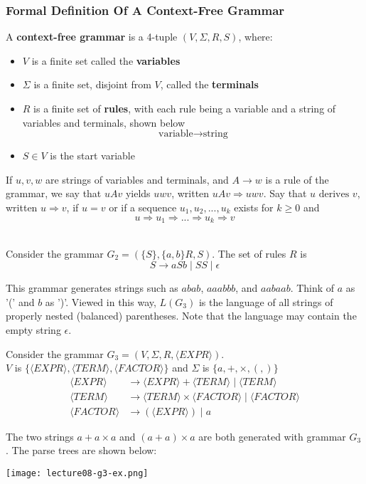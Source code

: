 \documentclass[11pt,a4paper]{article}
\begin{document}
\newpage
\subsubsection{Formal Definition Of A Context-Free Grammar}
\begin{definition}
    A \textbf{context-free grammar} is a 4-tuple $(V,\Sigma,R,S)$, where:
    \begin{itemize}
        \item $V$ is a finite set called the \textbf{variables}
        \item $\Sigma$ is a finite set, disjoint from $V$, called the \textbf{terminals}
        \item $R$ is a finite set of \textbf{rules}, with each rule being a variable and a string of variables and terminals, shown below
        $$\text{variable}\rightarrow\text{string}$$
        \item $S\in V$ is the start variable
    \end{itemize}
\end{definition}

If $u,v,w$ are strings of variables and terminals, and $A\rightarrow w$ is a rule of the grammar, we say that $uAv$ yields $uwv$, written $uAv\Rightarrow uwv$.
Say that $u\text{ derives } v$, written $u\Rightarrow v$, if $u=v$ or if a sequence $u_1,u_2,...,u_k$ exists for $k\geq 0$ and $$u\Rightarrow u_1\Rightarrow ...\Rightarrow u_k\Rightarrow v$$ \\


\begin{example}
    Consider the grammar $G_2=(\{S\},\{a,b\}R,S)$. The set of rules $R$ is $$S\rightarrow aSb\mid SS\mid\epsilon$$

    This grammar generates strings such as $abab$, $aaabbb$, and $aabaab$.
    Think of $a$ as '(' and $b$ as ')'. Viewed in this way, $L(G_3)$ is the language of all strings of properly nested (balanced) parentheses.
    Note that the language may contain the empty string $\epsilon$.
\end{example}

\begin{example}
    Consider the grammar $G_3=(V,\Sigma,R,\langle EXPR\rangle)$. \\

    $V$ is $\{\langle EXPR\rangle,\langle TERM\rangle,\langle FACTOR\rangle\}$ and $\Sigma$ is $\{a,+,\times, (, )\}$
    \begin{align*}
        \langle EXPR\rangle &\rightarrow\langle EXPR\rangle+\langle TERM\rangle\mid\langle TERM\rangle \\
        \langle TERM\rangle &\rightarrow\langle TERM\rangle\times\langle FACTOR\rangle\mid\langle FACTOR\rangle \\
        \langle FACTOR\rangle &\rightarrow (\langle EXPR\rangle)\mid a
    \end{align*}

    The two strings $a+a\times a$ and $(a+a)\times a$ are both generated with grammar $G_3$. The parse trees are shown below:

    \texttt{[image: lecture08-g3-ex.png]}
\end{example}
\end{document}

